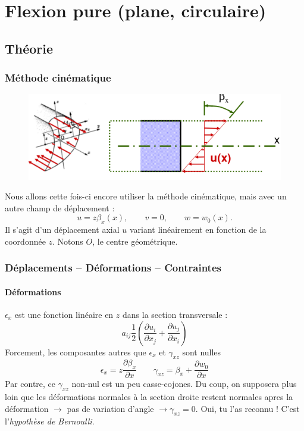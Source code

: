 \chapter{Flexion pure (plane, circulaire)}
\section{Théorie}
	\subsection{Méthode cinématique}
	\begin{figure}
	\vspace{-7mm}
	\includegraphics[scale=0.4]{ch4/image1.png}
	\end{figure}
	Nous allons cette fois-ci encore utiliser la méthode cinématique, mais 
	avec un autre champ de déplacement :
	\begin{equation}
	u=z\beta_x(x),\qquad v=0,\qquad w=w_0(x).
	\end{equation}
	Il s'agit d'un déplacement axial $u$ variant linéairement en fonction 
	de la coordonnée $z$. Notons $O$, le centre géométrique.
	
	\subsection{Déplacements – Déformations – Contraintes}
		\subsubsection{Déformations}
		$\epsilon_x$ est une fonction linéaire en $z$ dans la section 
		transversale :
		\begin{equation}
		a_{ij}  \frac{1}{2}\left(\dfrac{\partial u_i}{\partial x_j}+\dfrac{
		\partial u_j}{\partial x_i}\right)
		\end{equation}
		Forcement, les composantes autres que $\epsilon_x$ et $\gamma_{xz}$ 
		sont nulles
		\begin{equation}
		\epsilon_x = z\dfrac{\partial \beta_x}{\partial x}\qquad \gamma_{xz} = 
		\beta_x + \dfrac{\partial w_0}{\partial x}
		\end{equation}
		Par contre, ce $\gamma_{xz}$ non-nul est un peu casse-cojones. Du coup, 
		on supposera plus loin que les déformations normales à la section 
		droite restent normales apres la déformation $\rightarrow$ pas de 
		variation d'angle $\rightarrow \gamma_{xz} = 0$. Oui, tu l'as reconnu ! 
		C'est l'\textit{hypothèse de Bernoulli}.
		
